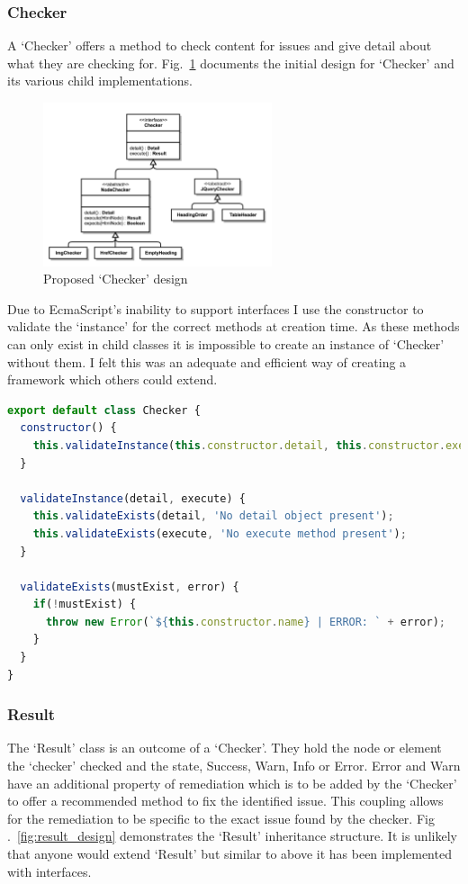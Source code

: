 \subsubsection{Checker}
A `Checker' offers a method to check content for issues and give detail
about what they are checking for. Fig.~\ref{fig:checker_design} documents the
initial design for `Checker' and its various child implementations.

\begin{figure}[H]
\centering
\includegraphics[width=0.6\textwidth]{figures/a11y_tool_checkers}
\captionsetup{justification=centering}
\caption{Proposed `Checker' design
\label{fig:checker_design}}
\end{figure}

Due to EcmaScript's inability to support interfaces I use the constructor to
validate the `instance' for the correct methods at creation time. As these
methods can only exist in child classes it is impossible to create an
instance of `Checker' without them. I felt this was an adequate and efficient
way of creating a framework which others could extend.

\begin{lstlisting}[language=JavaScript]
export default class Checker {
  constructor() {
    this.validateInstance(this.constructor.detail, this.constructor.execute);
  }

  validateInstance(detail, execute) {
    this.validateExists(detail, 'No detail object present');
    this.validateExists(execute, 'No execute method present');
  }

  validateExists(mustExist, error) {
    if(!mustExist) {
      throw new Error(`${this.constructor.name} | ERROR: ` + error);
    }
  }
}
\end{lstlisting}

\subsubsection{Result}
The `Result' class is an outcome of a `Checker'. They hold the node or element
the `checker' checked and the state, Success, Warn, Info or Error.
Error and Warn have an additional property of
remediation which is to be added by the `Checker' to offer a recommended
method to fix the identified issue. This coupling allows for the remediation
to be specific to the exact issue found by the checker. Fig
.~\ref{fig:result_design} demonstrates the `Result' inheritance structure. It is
unlikely that anyone would extend `Result' but similar to above it has been
implemented with interfaces.

